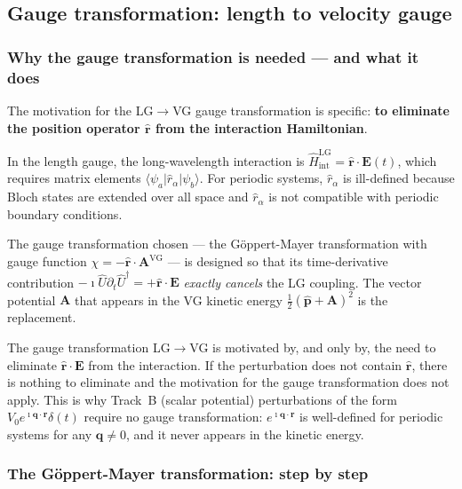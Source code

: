 \documentclass[11pt]{article}
\newcommand{\iunit}{\imath}
\newcommand{\Avec}{\mathbf{A}}
\newcommand{\Evec}{\mathbf{E}}
\newcommand{\phat}{\hat{\mathbf{p}}}
\newcommand{\rhat}{\hat{\mathbf{r}}}
\begin{document}
\subsection{Gauge transformation: length to velocity gauge}
\label{sec:VG}

\subsubsection{Why the gauge transformation is needed --- and what
  it does}

The motivation for the LG$\to$VG gauge transformation is specific:
\textbf{to eliminate the position operator $\rhat$ from the
interaction Hamiltonian}.

In the length gauge, the long-wavelength interaction is
$\hat{H}_\mathrm{int}^\mathrm{LG}=\rhat\cdot\Evec(t)$, which
requires matrix elements
$\langle\psi_a|\hat{r}_\alpha|\psi_b\rangle$.
For periodic systems, $\hat{r}_\alpha$ is ill-defined because Bloch
states are extended over all space and $\hat{r}_\alpha$ is not
compatible with periodic boundary conditions.

The gauge transformation chosen --- the G\"{o}ppert-Mayer
transformation with gauge function $\chi=-\rhat\cdot\Avec^\mathrm{VG}$
--- is designed so that its time-derivative contribution
$-\iunit\hat{U}\partial_t\hat{U}^\dagger = +\rhat\cdot\Evec$
\emph{exactly cancels} the LG coupling.
The vector potential $\Avec$ that appears in the VG kinetic energy
$\frac{1}{2}(\phat+\Avec)^2$ is the replacement.

\begin{keyresult}
The gauge transformation LG$\to$VG is motivated by, and only by,
the need to eliminate $\hat{\mathbf{r}}\cdot\mathbf{E}$ from the
interaction.
If the perturbation does not contain $\hat{\mathbf{r}}$, there
is nothing to eliminate and the motivation for the gauge
transformation does not apply.
This is why Track~B (scalar potential) perturbations of the form
$V_0 e^{\iunit\mathbf{q}\cdot\mathbf{r}}\delta(t)$ require no
gauge transformation: $e^{\iunit\mathbf{q}\cdot\mathbf{r}}$ is
well-defined for periodic systems for any $\mathbf{q}\neq0$,
and it never appears in the kinetic energy.
\end{keyresult}

\subsubsection{The G\"{o}ppert-Mayer transformation: step by step}
\end{document}
